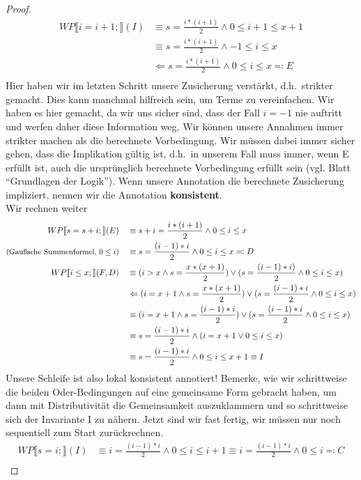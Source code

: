 \documentclass[hidelinks]{article}
\theoremstyle{plain}
\theoremstyle{definition}
\theoremstyle{rem}
\begin{document}
\begin{sloppypar}
\begin{proof}
\begin{align*}
WP\llbracket i=i+1;\rrbracket(I)&\equiv s=\frac{i*(i+1)}{2}\wedge 0\le i+1\le x+1\\
&\equiv s=\frac{i*(i+1)}{2}\wedge -1\le i\le x\\
&\Leftarrow s=\frac{i*(i+1)}{2}\wedge 0\le i\le x\eqqcolon E\\
\end{align*}
Hier haben wir im letzten Schritt unsere Zusicherung verstärkt, d.h.\ strikter gemacht. Dies kann manchmal hilfreich sein, um Terme zu vereinfachen. Wir haben es hier gemacht, da wir uns sicher sind, dass der Fall $i=-1$ nie auftritt und werfen daher diese Information weg. Wir können unsere Annahmen immer strikter machen als die berechnete Vorbedingung. Wir müssen dabei immer sicher gehen, dass die Implikation gültig ist, d.h.\ in unserem Fall muss immer, wenn E erfüllt ist, auch die ursprünglich berechnete Vorbedingung erfüllt sein (vgl. Blatt ``Grundlagen der Logik''). Wenn unsere Annotation die berechnete Zusicherung impliziert, nennen wir die Annotation \textbf{konsistent}.\\
Wir rechnen weiter
\begin{align*}
WP\llbracket s=s+i;\rrbracket(E)\quad&\equiv s+i=\frac{i*(i+1)}{2}\wedge 0\le i\le x\\
\text{\small{(Gaußsche Summenformel, $0\le i$)}}\quad&\equiv s=\frac{(i-1)*i}{2}\wedge 0\le i\le x\eqqcolon D\\
WP\llbracket i\le x;\rrbracket(F,D)\quad&\equiv (i>x \wedge s=\frac{x*(x+1)}{2})\vee (s=\frac{(i-1)*i)}{2}\wedge 0\le i\le x)\\
&\Leftarrow (i=x+1 \wedge s=\frac{x*(x+1)}{2})\vee (s=\frac{(i-1)*i}{2}\wedge 0\le i\le x)\\
&\equiv (i=x+1 \wedge s=\frac{(i-1)*i}{2})\vee (s=\frac{(i-1)*i}{2}\wedge 0\le i\le x)\\
&\equiv s=\frac{(i-1)*i}{2}\wedge(i=x+1 \vee 0\le i\le x)\\
&\equiv s=\frac{(i-1)*i}{2}\wedge 0\le i\le x+1\equiv I
\end{align*}
Unsere Schleife ist also lokal konsistent annotiert! Bemerke, wie wir schrittweise die beiden Oder-Bedingungen auf eine gemeinsame Form gebracht haben, um dann mit Distributivität die Gemeinsamkeit auszuklammern und so schrittweise sich der Invariante I zu nähern. Jetzt sind wir fast fertig, wir müssen nur noch sequentiell zum Start zurückrechnen.
\begin{align*}
WP\llbracket s=i;\rrbracket(I)&\equiv i=\frac{(i-1)*i}{2}\wedge 0\le i\le i+1\equiv i=\frac{(i-1)*i}{2}\wedge 0\le i\eqqcolon C\\

\end{align*}
\end{proof}
\end{sloppypar}
\end{document}
